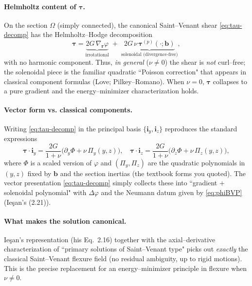 \paragraph{Helmholtz content of $\bm{\tau}$.}
On the section $\Omega$ (simply connected), the canonical Saint–Venant shear \eqref{eq:tau-decomp} has the Helmholtz–Hodge decomposition
\[
\bm{\tau}= \underbrace{2G\,\nabla_{\!\bm{r}}\varphi}_{\text{irrotational}} \;+\; \underbrace{2G\,\nu\,\bm{\tau}^{\!(p)}(\cdot;\bm{b})}_{\text{solenoidal (divergence-free)}},
\]
with no harmonic component. Thus, \emph{in general} ($\nu\neq 0$) the shear is \emph{not} curl–free; the solenoidal piece is the familiar quadratic ``Poisson correction" that appears in classical component formulas (Love; Pilkey–Romano). When $\nu=0$, $\bm{\tau}$ collapses to a pure gradient and the energy–minimizer characterization holds.

\paragraph{Vector form vs. classical components.}
Writing \eqref{eq:tau-decomp} in the principal basis $\{\mathbf{i}_y,\mathbf{i}_z\}$ reproduces the standard expressions
\[
\bm{\tau}\cdot\mathbf{i}_y=\frac{2G}{1+\nu}\Big(\partial_y\Phi+\nu\,\Pi_y(y,z)\Big),\quad
\bm{\tau}\cdot\mathbf{i}_z=\frac{2G}{1+\nu}\Big(\partial_z\Phi+\nu\,\Pi_z(y,z)\Big),
\]
where $\Phi$ is a scaled version of $\varphi$ and $(\Pi_y,\Pi_z)$ are the quadratic polynomials in $(y,z)$ fixed by $\bm{b}$ and the section inertias (the textbook forms you quoted). The vector presentation \eqref{eq:tau-decomp} simply collects these into ``gradient $+$ solenoidal polynomial" with $\Delta\varphi$ and the Neumann datum given by \eqref{eq:phiBVP} (Ieşan’s (2.21)).

\paragraph{What makes the solution canonical.}
Ieşan’s representation (his Eq.\ 2.16) together with the axial–derivative characterization of ``primary solutions of Saint–Venant type" picks out \emph{exactly} the classical Saint–Venant flexure field (no residual ambiguity, up to rigid motions). 
This is the precise replacement for an energy–minimizer principle in flexure when $\nu\neq 0$. 


